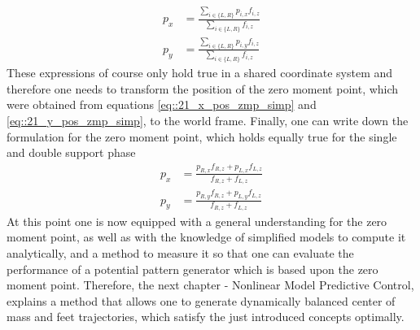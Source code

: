 \begin{align}
	p_x &= \frac{\sum_{i\in\{L, R\}}p_{i,x}f_{i,z}}{\sum_{i\in\{L, R\}}f_{i,z}} \\
	p_y &= \frac{\sum_{i\in\{L, R\}}p_{i,y}f_{i,z}}{\sum_{i\in\{L, R\}}f_{i,z}}
\end{align}
These expressions of course only hold true in a shared coordinate system and therefore one needs to transform the position of the zero moment point, which were obtained from equations \ref{eq::21_x_pos_zmp_simp} and \ref{eq::21_y_pos_zmp_simp}, to the world frame. Finally, one can write down the formulation for the zero moment point, which holds equally true for the single and double support phase
\begin{align}
	p_x &= \frac{p_{R,x}f_{R,z}+p_{L,x}f_{L,z}}{f_{R,z}+f_{L,z}} 
	\label{eq::21_double_zmp_x} \\
	p_y &= \frac{p_{R,y}f_{R,z}+p_{L,y}f_{L,z}}{f_{R,z}+f_{L,z}}
	\label{eq::21_double_zmp_y}
\end{align}
At this point one is now equipped with a general understanding for the zero moment point, as well as with the knowledge of simplified models to compute it analytically, and a method to measure it so that one can evaluate the performance of a potential pattern generator which is based upon the zero moment point. Therefore, the next chapter - Nonlinear Model Predictive Control, explains a method that allows one to generate dynamically balanced center of mass and feet trajectories, which satisfy the just introduced concepts optimally.
